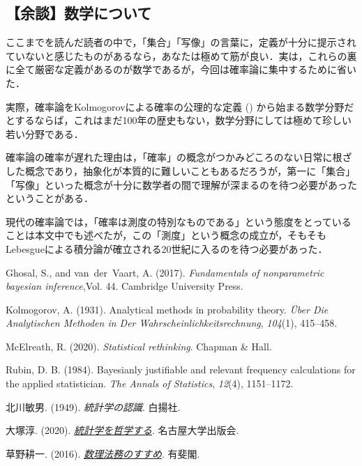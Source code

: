 \documentclass[
  letterpaper,
  DIV=11,
  numbers=noendperiod]{scrartcl}
\newlength{\cslhangindent}
\newenvironment{CSLReferences}[2] %
 {\begin{list}{}{%
  \setlength{\itemindent}{0pt}
  \setlength{\leftmargin}{0pt}
  \setlength{\parsep}{0pt}
  \ifodd #1
   \setlength{\leftmargin}{\cslhangindent}
   \setlength{\itemindent}{-1\cslhangindent}
  \fi
  \setlength{\itemsep}{#2\baselineskip}}}
 {\end{list}}
\begin{document}
\subsection{【余談】数学について}\label{ux4f59ux8ac7ux6570ux5b66ux306bux3064ux3044ux3066}

ここまでを読んだ読者の中で，「集合」「写像」の言葉に，定義が十分に提示されていないと感じたものがあるなら，あなたは極めて筋が良い．実は，これらの裏に全て厳密な定義があるのが数学であるが，今回は確率論に集中するために省いた．

実際，確率論をKolmogorovによる確率の公理的な定義
()
から始まる数学分野だとするならば，これはまだ100年の歴史もない，数学分野にしては極めて珍しい若い分野である．

確率論の確率が遅れた理由は，「確率」の概念がつかみどころのない日常に根ざした概念であり，抽象化が本質的に難しいこともあるだろうが，第一に「集合」「写像」といった概念が十分に数学者の間で理解が深まるのを待つ必要があったということがある．

現代の確率論では，「確率は測度の特別なものである」という態度をとっていることは本文中でも述べたが，この「測度」という概念の成立が，そもそもLebesgueによる積分論が確立される20世紀に入るのを待つ必要があった．

\label{refs}
\begin{CSLReferences}{1}{1}
Ghosal, S., and van~der~Vaart, A. (2017). \emph{Fundamentals of
nonparametric bayesian inference},Vol. 44. Cambridge University Press.

Kolmogorov, A. (1931). Analytical methods in probability theory.
\emph{Über Die Analytischen Methoden in Der
Wahrscheinlichkeitsrechnung}, \emph{104}(1), 415--458.

McElreath, R. (2020). \emph{Statistical rethinking}. Chapman \& Hall.

Rubin, D. B. (1984). Bayesianly justifiable and relevant frequency
calculations for the applied statistician. \emph{The Annals of
Statistics}, \emph{12}(4), 1151--1172.

北川敏男. (1949). \emph{統計学の認識}. 白揚社.

大塚淳. (2020). \emph{\href{}{統計学を哲学する}}. 名古屋大学出版会.

草野耕一. (2016).
\emph{\href{https://www.yuhikaku.co.jp/books/detail/9784641125889}{数理法務のすすめ}}.
有斐閣.

\end{CSLReferences}
\end{document}
